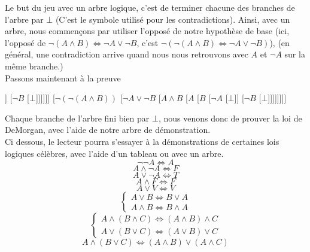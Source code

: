 \documentclass[a4paper, 12pt]{article}
\newcommand{\ffi}{\Leftrightarrow}
\numberwithin{equation}{subsection}
\begin{document}
  Le but du jeu avec un arbre logique, c'est de terminer chacune des branches de l'arbre par $\bot$ (C'est le symbole utilisé pour les contradictions). Ainsi, avec un arbre, nous commençons par utiliser l'opposé de notre hypothèse de base (ici, l'opposé de $\neg (A \land B) \ffi \neg A \lor \neg B$, c'est $\neg (\neg (A \land B) \ffi \neg A \lor \neg B)$), (en général, une contradiction arrive quand nous nous retrouvons avec $A$ et $\neg A$ sur la même branche.) \\
  Passons maintenant à la preuve
  \begin{center}
  \begin{forest}
  [$\neg (\neg (A \land B) \ffi \neg A \lor \neg B)$
    [$\neg(A \land B)$
    [$\neg (\neg A \lor \neg B)$
    [$A$
    [$B$
    [$\neg A$
    [$\bot$]]
    [$\neg B$
    [$\bot$]]]]]]
    [$\neg (\neg (A \land B))$
    [$ \neg A \lor \neg B$
    [$A \land B$
    [$A$
    [$B$
    [$\neg A$
    [$\bot$]]
    [$\neg B$
    [$\bot$]]]]]]]]
  \end{forest}
\end{center}
Chaque branche de l'arbre fini bien par $\bot$, nous venons donc de prouver la loi de DeMorgan, avec l'aide de notre arbre de démonstration. \\[1.0cm]
    Ci dessous, le lecteur pourra s'essayer à la démonstrations de certaines lois logiques célèbres, avec l'aide d'un tableau ou avec un arbre. \\[1.0cm]
  \begin{equation}\neg \neg A \ffi A \end{equation}
  \begin{equation} A \land \neg A \ffi F \end{equation}
  \begin{equation} A \lor \neg A \ffi T \end{equation}
  \begin{equation} A \land F \ffi F \end{equation}
  \begin{equation} A \lor V \ffi V \end{equation}
  \begin{equation}
    \begin{cases}
      A \lor B \ffi B \lor A \\
      A \land B \ffi B \land A
    \end{cases}
  \end{equation}
  \begin{equation}
    \begin{cases}
      A \land (B \land C) \ffi (A \land B) \land C \\
      A \lor (B \lor C) \ffi (A \lor B) \lor C
    \end{cases}
  \end{equation}
  \begin{equation}A \land (B \lor C) \ffi (A \land B) \lor (A \land C) \end{equation}
\end{document}
